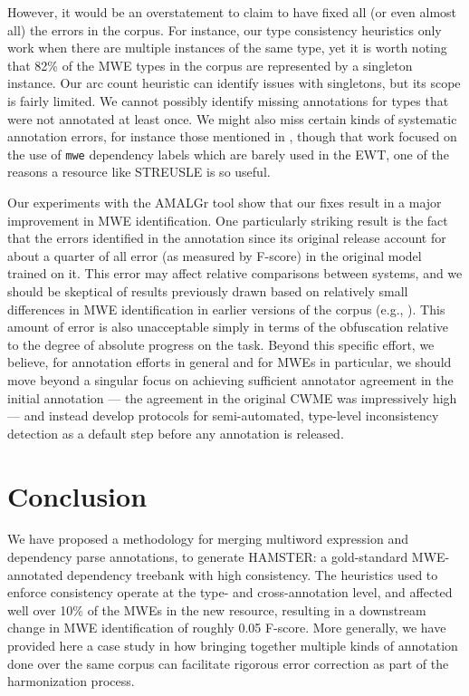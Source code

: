 \documentclass[output=paper
,modfonts
,nonflat]{langsci/langscibook}
\newcommand{\mwetype}[1]{\texttt{#1}\xspace}
\begin{document}
However, it would be an overstatement to claim to have fixed all (or even almost all) the errors in the corpus. For instance, our type consistency heuristics only work when there are multiple instances of the same type, yet it is worth noting that 82\% of the MWE types in the corpus are represented by a singleton instance. Our arc count heuristic can identify issues with singletons, but its scope is fairly limited. We cannot possibly identify missing annotations for types that were not annotated at least once. We might also miss certain kinds of systematic annotation errors, for instance those mentioned in \citet{de2015studying}, though that work focused on the use of \mwetype{mwe} dependency labels which are barely used in the EWT, one of the reasons a resource like STREUSLE is so useful.

Our experiments with the AMALGr tool show that our fixes result in a major improvement in MWE identification. One particularly striking result is the fact that the errors identified in the annotation since its original release account for about a quarter of all error (as measured by F-score) in the original model trained on it. This error may affect relative comparisons between systems, and we should be skeptical of results previously drawn based on relatively small differences in MWE identification in earlier versions of the corpus (e.g., \citet{Qu+:2015a}). This amount of error is also unacceptable simply in terms of the obfuscation relative to the degree of absolute progress on the task. Beyond this specific effort, we believe, for annotation efforts in general and for MWEs in particular, we should move beyond a singular focus on achieving sufficient annotator agreement in the initial annotation --- the agreement in the original CWME was impressively high --- and instead develop protocols for semi-automated, type-level inconsistency detection as a default step before any annotation is released. 

\section{Conclusion}

We have proposed a methodology for merging multiword expression and dependency parse annotations, to generate HAMSTER: a gold-standard MWE-annotated dependency treebank with high consistency. The heuristics used to enforce consistency operate at the type- and cross-annotation level, and affected well over 10\% of the MWEs in the new resource, resulting in a downstream change in MWE identification of roughly 0.05 F-score. More generally, we have provided here a case study in how bringing together multiple kinds of annotation done over the same corpus can facilitate rigorous error correction as part of the harmonization process.

%
%

{\sloppy
\printbibliography[heading=subbibliography,notkeyword=this]
}
\end{document}

